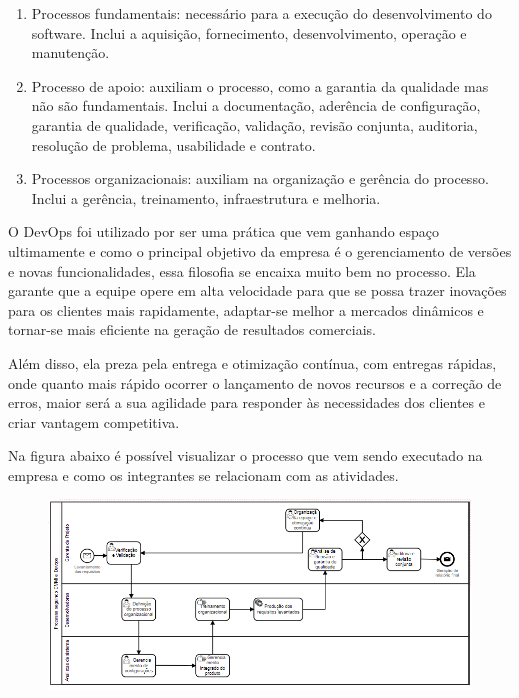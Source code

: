 \documentclass[	DIV=calc,%
							paper=a4,%
							fontsize=12pt,%
							onecolumn]{scrartcl}	 					%
\begin{document}
\begin{enumerate}
	\item Processos fundamentais: necessário para a execução do desenvolvimento do software. Inclui a aquisição, fornecimento,
	desenvolvimento, operação e manutenção.
	\item Processo de apoio: auxiliam o processo, como a garantia da qualidade mas não são fundamentais. Inclui a documentação,
	aderência de configuração, garantia de qualidade, verificação, validação, revisão conjunta, auditoria, resolução de problema,
	usabilidade e contrato.
	\item Processos organizacionais: auxiliam na organização e gerência do processo. Inclui a gerência, treinamento, infraestrutura e melhoria.
\end{enumerate}

O DevOps foi utilizado por ser uma prática que vem ganhando espaço ultimamente e como o principal objetivo da empresa é o gerenciamento de versões e novas funcionalidades, essa filosofia se encaixa muito bem no processo. Ela garante que a equipe opere em alta velocidade para que se possa trazer inovações para os clientes mais rapidamente, adaptar-se melhor a mercados dinâmicos e tornar-se mais eficiente na geração de resultados comerciais. 

Além disso, ela preza pela entrega e otimização contínua, com entregas rápidas, onde quanto mais rápido ocorrer o lançamento de novos recursos e a correção de erros, maior será a sua agilidade para responder às necessidades dos clientes e criar vantagem competitiva. 


Na figura abaixo é possível visualizar o processo que vem sendo executado na empresa e como os integrantes se relacionam com as atividades.

\begin{figure}[!h]
	\centering
	\includegraphics[scale=0.8]{processo-final(bpmn)}
\end{figure}
\end{document}
